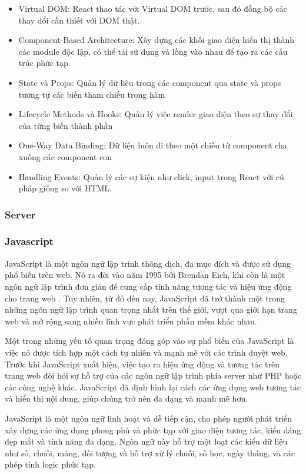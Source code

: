 \begin{itemize}
  \item Virtual DOM: React thao tác với Virtual DOM trước, sau đó đồng bộ các thay đổi cần thiết với DOM thật.
  \item Component-Based Architecture: Xây dựng các khối giao diện hiển thị thành các module độc lập, có thể tái sử dụng và lồng vào nhau để tạo ra các cấu trúc phức tạp.
  \item State và Props: Quản lý dữ liệu trong các component qua state và props tương tự các biến tham chiếu trong hàm 
  \item Lifecycle Methods và Hooks: Quản lý việc render giao diện theo sự thay đổi của từng biến thành phần
  \item  One-Way Data Binding: Dữ liệu luôn đi theo một chiều từ component cha xuống các component con
  \item Handling Events: Quản lý các sự kiện như click, input trong React với cú pháp giống so với HTML.
\end{itemize}


\subsubsection{Server}
\subsubsection{Javascript}
\mbox{}

JavaScript là một ngôn ngữ lập trình thông dịch, đa mục đích và được sử dụng phổ biến trên web. Nó ra đời vào năm 1995 bởi Brendan Eich, khi còn là một ngôn ngữ lập trình đơn giản để cung cấp tính năng tương tác và hiệu ứng động cho trang web \cite{js_1}. Tuy nhiên, từ đó đến nay, JavaScript đã trở thành một trong những ngôn ngữ lập trình quan trọng nhất trên thế giới, vượt qua giới hạn trang web và mở rộng sang nhiều lĩnh vực phát triển phần mềm khác nhau.

Một trong những yếu tố quan trọng đóng góp vào sự phổ biến của JavaScript là việc nó được tích hợp một cách tự nhiên và mạnh mẽ với các trình duyệt web. Trước khi JavaScript xuất hiện, việc tạo ra hiệu ứng động và tương tác trên trang web đòi hỏi sự hỗ trợ của các ngôn ngữ lập trình phía server như PHP hoặc các công nghệ khác. JavaScript đã định hình lại cách các ứng dụng web tương tác và hiển thị nội dung, giúp chúng trở nên đa dạng và mạnh mẽ hơn.

JavaScript là một ngôn ngữ linh hoạt và dễ tiếp cận, cho phép người phát triển xây dựng các ứng dụng phong phú và phức tạp với giao diện tương tác, kiểu dáng đẹp mắt và tính năng đa dạng. Ngôn ngữ này hỗ trợ một loạt các kiểu dữ liệu như số, chuỗi, mảng, đối tượng và hỗ trợ xử lý chuỗi, số học, ngày tháng, và các phép tính logic phức tạp.

